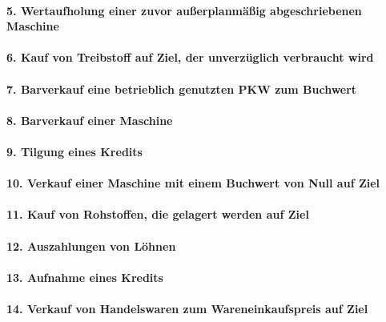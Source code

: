 \documentclass[paper=a4, fontsize=11pt]{scrartcl}
\numberwithin{equation}{section}
\numberwithin{figure}{section}
\numberwithin{table}{section}
\begin{document}
\paragraph{5. Wertaufholung einer zuvor außerplanmäßig abgeschriebenen Maschine}

\paragraph{6. Kauf von Treibstoff auf Ziel, der unverzüglich verbraucht wird}

\paragraph{7. Barverkauf eine betrieblich genutzten PKW zum Buchwert}

\paragraph{8. Barverkauf einer Maschine}

\paragraph{9. Tilgung eines Kredits}

\paragraph{10. Verkauf einer Maschine mit einem Buchwert von Null auf Ziel}

\paragraph{11. Kauf von Rohstoffen, die gelagert werden auf Ziel}

\paragraph{12. Auszahlungen von Löhnen}

\paragraph{13. Aufnahme eines Kredits}

\paragraph{14. Verkauf von Handelswaren zum Wareneinkaufspreis auf Ziel}
\end{document}
